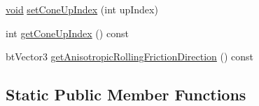 \begin{DoxyCompactItemize}
\item 
\mbox{\hyperlink{_thread_8h_af1e856da2e658414cb2456cb6f7ebc66}{void}} \mbox{\hyperlink{classnjli_1_1_physics_shape_cone_a411e6e50e05af10e3d4c71e8240775b5}{set\+Cone\+Up\+Index}} (int up\+Index)
\item 
int \mbox{\hyperlink{classnjli_1_1_physics_shape_cone_a8c35f240d1e7e38239db309d935792ac}{get\+Cone\+Up\+Index}} () const
\item 
bt\+Vector3 \mbox{\hyperlink{classnjli_1_1_physics_shape_cone_add550b724bf1cf271ce69b3f2f3de399}{get\+Anisotropic\+Rolling\+Friction\+Direction}} () const
\end{DoxyCompactItemize}
\subsection*{Static Public Member Functions}
